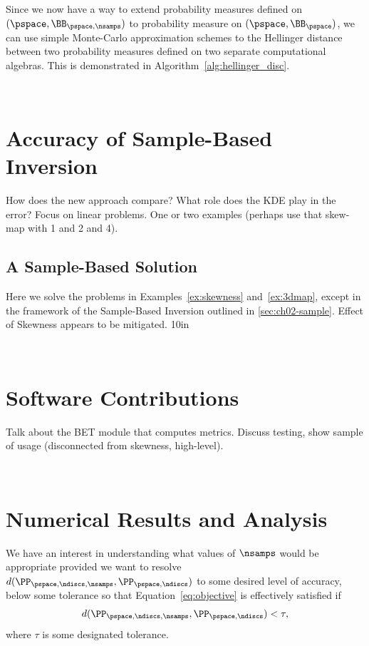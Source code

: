 Since we now have a way to extend probability measures defined on $(\pspace, \BB_{\pspace, \nsamps})$ to  probability measure on $(\pspace, \BB_{\pspace})$, we can use simple Monte-Carlo approximation schemes to the Hellinger distance between two probability measures defined on two separate computational algebras.
This is demonstrated in Algorithm~\ref{alg:hellinger_disc}.







\
\section{Accuracy of Sample-Based Inversion}\label{sec:ch03-sample}

How does the new approach compare? What role does the KDE play in the error?
Focus on linear problems. One or two examples (perhaps use that skew-map with 1 and 2 and 4).


\subsection{A Sample-Based Solution}\label{eq:sampleskew}

Here we solve the problems in Examples~\ref{ex:skewness} and~\ref{ex:3dmap}, except in the framework of the Sample-Based Inversion outlined in \ref{sec:ch02-sample}.
Effect of Skewness appears to be mitigated.
\vfill{10in}


\
\section{Software Contributions}\label{sec:ch03-software}

Talk about the BET module that computes metrics.
Discuss testing, show sample of usage (disconnected from skewness, high-level).


\
\section{Numerical Results and Analysis}\label{sec:ch03-examples}


We have an interest in understanding what values of $\nsamps$ would be appropriate provided we want to resolve $d(\PP_{\pspace, \ndiscs, \nsamps}, \PP_{\pspace, \ndiscs})$ to some desired level of accuracy, below some tolerance so that Equation~\eqref{eq:objective} is effectively satisfied if
\begin{equation}\label{eq:newobjective}
d(\PP_{\pspace, \ndiscs, \nsamps}, \PP_{\pspace,\ndiscs}) < \tau,
\end{equation}
where $\tau$ is some designated tolerance.

